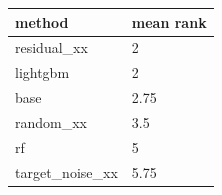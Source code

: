 \begin{tabular}{ll}
\toprule
method & mean rank \\
\midrule
residual\_xx & 2 \\
lightgbm & 2 \\
base & 2.75 \\
random\_xx & 3.5 \\
rf & 5 \\
target\_noise\_xx & 5.75 \\
\bottomrule
\end{tabular}
